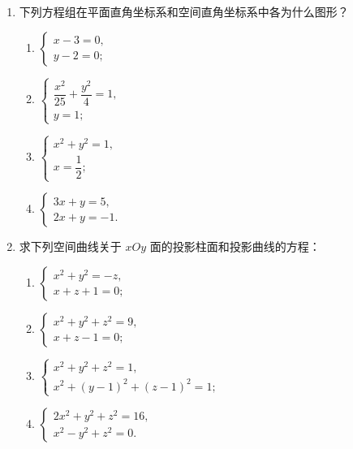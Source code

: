 \begin{enumerate}
    \item 下列方程组在平面直角坐标系和空间直角坐标系中各为什么图形？
    \begin{enumerate}[(1)]\setlength{\itemsep}{5pt}\setlength{\topsep}{15pt}
        \item $\begin{cases}
            x-3=0,\\
            y-2=0;
        \end{cases}$
        \item $\begin{cases}
            \dfrac{x^2}{25}+\dfrac{y^2}{4}=1,\\
            y=1;
        \end{cases}$
        \item $\begin{cases}
            x^2+y^2=1,\\
            x=\dfrac{1}{2};
        \end{cases}$
        \item $\begin{cases}
            3x+y=5,\\
            2x+y=-1.
        \end{cases}$
    \end{enumerate}

    \item 求下列空间曲线关于 $xOy$ 面的投影柱面和投影曲线的方程：
    \begin{enumerate}[(1)]\setlength{\itemsep}{5pt}\setlength{\topsep}{15pt}
        \item $\begin{cases}
            x^2+y^2=-z,\\
            x+z+1=0;
        \end{cases}$
        \item $\begin{cases}
            x^2+y^2+z^2=9,\\
            x+z-1=0;
        \end{cases}$
        \item $\begin{cases}
            x^2+y^2+z^2=1,\\
            x^2+(y-1)^2+(z-1)^2=1;
        \end{cases}$
        \item $\begin{cases}
            2x^2+y^2+z^2=16,\\
            x^2-y^2+z^2=0.
        \end{cases}$
    \end{enumerate}


\end{enumerate}
